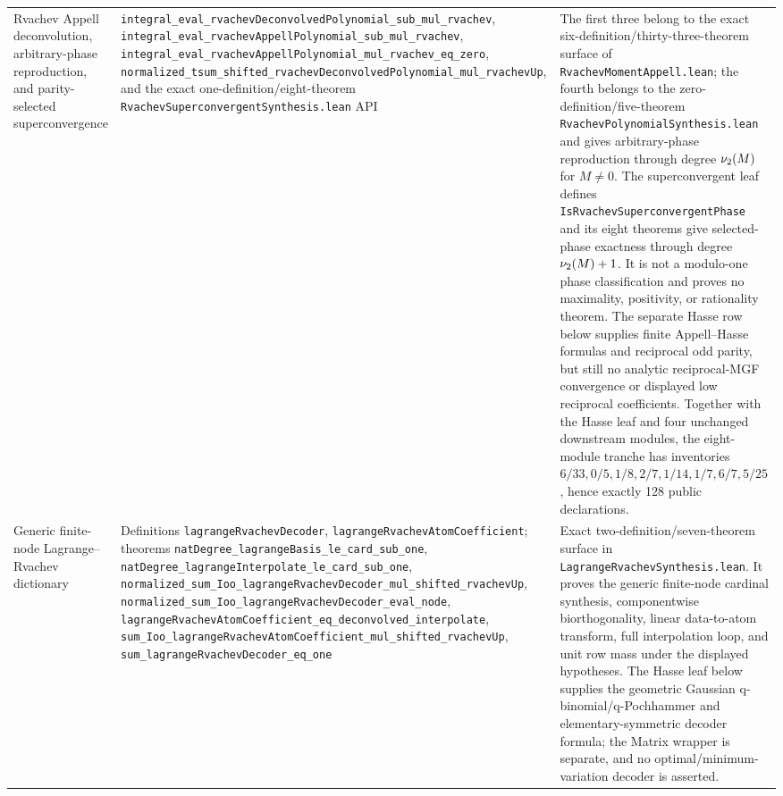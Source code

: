 \documentclass[11pt,oneside]{article}
\theoremstyle{definition}
\theoremstyle{remark}
\begin{document}
\begin{longtable}{@{}>{\raggedright\arraybackslash}p{} >{\raggedright\arraybackslash}p{} >{\raggedright\arraybackslash}p{}@{}}
Rvachev Appell deconvolution, arbitrary-phase reproduction, and parity-selected superconvergence & \nolinkurl{integral_eval_rvachevDeconvolvedPolynomial_sub_mul_rvachev}, \nolinkurl{integral_eval_rvachevAppellPolynomial_sub_mul_rvachev}, \nolinkurl{integral_eval_rvachevAppellPolynomial_mul_rvachev_eq_zero}, \nolinkurl{normalized_tsum_shifted_rvachevDeconvolvedPolynomial_mul_rvachevUp}, and the exact one-definition/eight-theorem \nolinkurl{RvachevSuperconvergentSynthesis.lean} API & The first three belong to the exact six-definition/thirty-three-theorem surface of \nolinkurl{RvachevMomentAppell.lean}; the fourth belongs to the zero-definition/five-theorem \nolinkurl{RvachevPolynomialSynthesis.lean} and gives arbitrary-phase reproduction through degree \(\nu_{2}(M)\) for \(M\ne0\).  The superconvergent leaf defines \nolinkurl{IsRvachevSuperconvergentPhase} and its eight theorems give selected-phase exactness through degree \(\nu_{2}(M)+1\).  It is not a modulo-one phase classification and proves no maximality, positivity, or rationality theorem.  The separate Hasse row below supplies finite Appell--Hasse formulas and reciprocal odd parity, but still no analytic reciprocal-MGF convergence or displayed low reciprocal coefficients.  Together with the Hasse leaf and four unchanged downstream modules, the eight-module tranche has inventories \(6/33,\allowbreak{}0/5,\allowbreak{}1/8,\allowbreak{}2/7,\allowbreak{}1/14,\allowbreak{}1/7,\allowbreak{}6/7,\allowbreak{}5/25\), hence exactly 128 public declarations. \\
Generic finite-node Lagrange--Rvachev dictionary & Definitions \nolinkurl{lagrangeRvachevDecoder}, \nolinkurl{lagrangeRvachevAtomCoefficient}; theorems \nolinkurl{natDegree_lagrangeBasis_le_card_sub_one}, \nolinkurl{natDegree_lagrangeInterpolate_le_card_sub_one}, \nolinkurl{normalized_sum_Ioo_lagrangeRvachevDecoder_mul_shifted_rvachevUp}, \nolinkurl{normalized_sum_Ioo_lagrangeRvachevDecoder_eval_node}, \nolinkurl{lagrangeRvachevAtomCoefficient_eq_deconvolved_interpolate}, \nolinkurl{sum_Ioo_lagrangeRvachevAtomCoefficient_mul_shifted_rvachevUp}, \nolinkurl{sum_lagrangeRvachevDecoder_eq_one} & Exact two-definition/seven-theorem surface in \nolinkurl{LagrangeRvachevSynthesis.lean}.  It proves the generic finite-node cardinal synthesis, componentwise biorthogonality, linear data-to-atom transform, full interpolation loop, and unit row mass under the displayed hypotheses.  The Hasse leaf below supplies the geometric Gaussian q-binomial/q-Pochhammer and elementary-symmetric decoder formula; the Matrix wrapper is separate, and no optimal/minimum-variation decoder is asserted. \\

\end{longtable}
\end{document}
